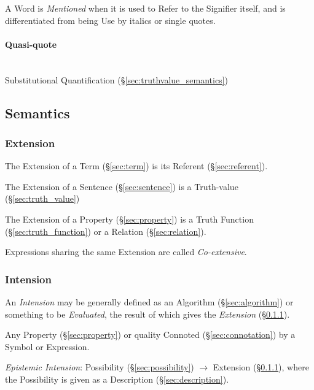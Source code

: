 A Word is \emph{Mentioned} when it is used to Refer to the Signifier
itself, and is differentiated from being Use by italics or single
quotes.



\paragraph{Quasi-quote}\label{sec:quasi_quote}
\hfill \\

Substitutional Quantification (\S\ref{sec:truthvalue_semantics})



\subsection{Semantics}\label{sec:semantics}

\subsubsection{Extension}\label{sec:extension}\cite{chalmers02}

The Extension of a Term (\S\ref{sec:term}) is its Referent
(\S\ref{sec:referent}).

The Extension of a Sentence (\S\ref{sec:sentence}) is a Truth-value
(\S\ref{sec:truth_value})

The Extension of a Property (\S\ref{sec:property}) is a Truth Function
(\S\ref{sec:truth_function}) or a Relation (\S\ref{sec:relation}).

Expressions sharing the same Extension are called \emph{Co-extensive}.



\subsubsection{Intension}\label{sec:intension}\cite{chalmers02}

An \emph{Intension} may be generally defined as an Algorithm
(\S\ref{sec:algorithm}) or something to be \emph{Evaluated}, the
result of which gives the \emph{Extension} (\S\ref{sec:extension}).

Any Property (\S\ref{sec:property}) or quality Connoted
(\S\ref{sec:connotation}) by a Symbol or Expression.

\emph{Epistemic Intension}: Possibility (\S\ref{sec:possibility})
$\rightarrow$ Extension (\S\ref{sec:extension}), where the Possibility
is given as a Description (\S\ref{sec:description}).

